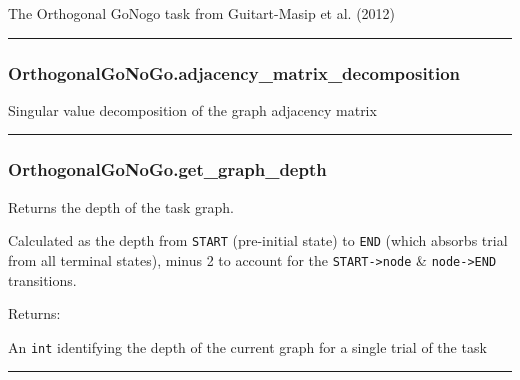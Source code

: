 The Orthogonal GoNogo task from Guitart-Masip et al. (2012)

\begin{center}\rule{0.5\linewidth}{\linethickness}\end{center}

\subsubsection{OrthogonalGoNoGo.adjacency\_matrix\_decomposition}\label{orthogonalgonogo.adjacency_matrix_decomposition}

\begin{Shaded}
\begin{Highlighting}[]
\NormalTok{)}
\end{Highlighting}
\end{Shaded}

Singular value decomposition of the graph adjacency matrix

\begin{center}\rule{0.5\linewidth}{\linethickness}\end{center}

\subsubsection{OrthogonalGoNoGo.get\_graph\_depth}\label{orthogonalgonogo.get_graph_depth}

\begin{Shaded}
\begin{Highlighting}[]
\NormalTok{)}
\end{Highlighting}
\end{Shaded}

Returns the depth of the task graph.

Calculated as the depth from \texttt{START} (pre-initial state) to
\texttt{END} (which absorbs trial from all terminal states), minus 2 to
account for the \texttt{START-\textgreater{}node} \&
\texttt{node-\textgreater{}END} transitions.

Returns:

An \texttt{int} identifying the depth of the current graph for a single
trial of the task

\begin{center}\rule{0.5\linewidth}{\linethickness}\end{center}

